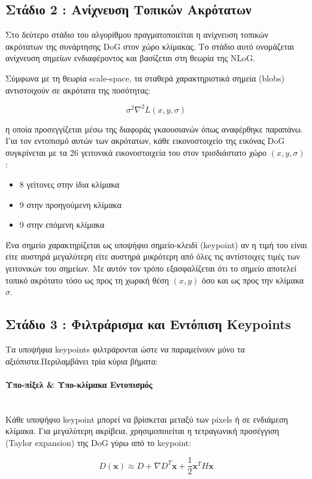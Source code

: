 \documentclass[12pt]{article}
\begin{document}
\subsection{Στάδιο 2 : Ανίχνευση Τοπικών Ακρότατων}
Στο δεύτερο στάδιο του αλγορίθμου πραγματοποιείται η ανίχνευση τοπικών ακρότατων της συνάρτησης DoG στον χώρο κλίμακας. 
Το στάδιο αυτό ονομάζεται ανίχνευση σημείων ενδιαφέροντος και βασίζεται στη θεωρία της NLoG.

Σύμφωνα με τη θεωρία scale-space, τα σταθερά χαρακτηριστικά σημεία (blobs) αντιστοιχούν σε ακρότατα της ποσότητας:

\[
\sigma^2 \nabla^2 L(x,y,\sigma)
\]

η οποία προσεγγίζεται μέσω της διαφοράς γκαουσιανών όπως αναφέρθηκε παραπάνω. Για τον εντοπισμό αυτών των ακρότατων, κάθε εικονοστοιχείο της εικόνας DoG
συγκρίνεται με τα 26 γειτονικά εικονοστοιχεία του στον τρισδιάστατο χώρο $(x,y,\sigma)$:  
\begin{itemize}
    \item 8 γείτονες στην ίδια κλίμακα
    \item 9 στην προηγούμενη κλίμακα
    \item  9 στην επόμενη κλίμακα
\end{itemize}
Ένα σημείο χαρακτηρίζεται ως υποψήφιο σημείο-κλειδί (keypoint) αν η τιμή του είναι είτε αυστηρά μεγαλύτερη είτε αυστηρά μικρότερη
από όλες τις αντίστοιχες τιμές των γειτονικών του σημείων. Με αυτόν τον τρόπο εξασφαλίζεται ότι το σημείο αποτελεί τοπικό ακρότατο τόσο ως προς τη χωρική
θέση $(x,y)$ όσο και ως προς την κλίμακα $\sigma$.

\subsection{Στάδιο 3 : Φιλτράρισμα και Εντόπιση Keypoints}
Τα υποψήφια keypoints φιλτράρονται ώστε να παραμείνουν μόνο τα αξιόπιστα.Περιλαμβάνει τρία κύρια βήματα:
\paragraph{Υπο-πίξελ \& Υπο-κλίμακα Εντοπισμός}
\mbox{}\\
Κάθε υποψήφιο keypoint μπορεί να βρίσκεται μεταξύ των pixels ή σε ενδιάμεση κλίμακα. Για μεγαλύτερη ακρίβεια, χρησιμοποιείται η τετραγωνική προσέγγιση (Taylor expansion) της DoG γύρω από το keypoint:

\[
D(\mathbf{x}) \approx D + \nabla D^T \mathbf{x} + \frac{1}{2} \mathbf{x}^T H \mathbf{x}
\]
\end{document}
